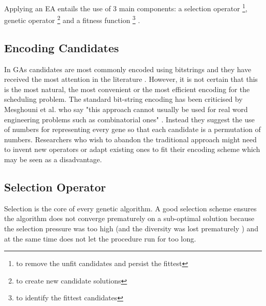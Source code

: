 \documentclass[a4paper, 12pt, titlepage]{article}
\begin{document}
Applying an EA entails the use of 3 main components: a selection
operator \footnote{to remove the unfit candidates and persist the
fittest}, genetic operator \footnote{to create new candidate solutions}
and a fitness function \footnote{to identify the fittest candidates}
\cite{mesghouni2004, yu2002, diveev2017, aljarrah2017, timilsina2015}.

\subsection*{Encoding Candidates}


In GAs candidates are most commonly encoded using bitstrings
\cite[p.~127]{norvig2010} and they have received the most attention in
the literature \cite[p.~103]{eberhart2007}. However, it is not certain
that this is the most natural, the most convenient or the most efficient encoding
for the scheduling problem. The standard bit-string encoding has been
criticised by Mesghouni et al. who say "this approach cannot usually
be used for real word engineering problems such as combinatorial ones"
\cite[p.~93]{mesghouni2004}. Instead they suggest the use of numbers for
representing every gene so that each candidate is a permutation of numbers.
Researchers who wish to abandon the traditional approach might need to
invent new operators or adapt existing ones to fit their encoding scheme which
may be seen as a disadvantage. 


\subsection*{Selection Operator}


Selection is the core of every genetic algorithm. A good selection scheme
ensures the algorithm does not converge prematurely on a sub-optimal
solution because the selection pressure was too high (and the diversity was
lost prematurely \cite[p.~23]{floreano2008}) and at the same
time does not let the procedure run for too long. \cite{yu2002}
\end{document}
